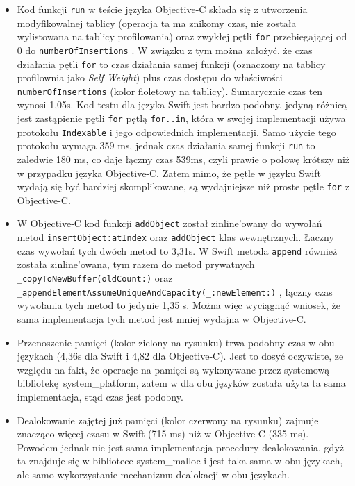 \documentclass[mgr, shortabstract]{iithesis}
\newcommand{\swiftinline}[1]{
    \texttt{#1}
}
\newcommand{\objcinline}[1]{
    \texttt{#1}
}
\begin{document}
\begin{itemize}
    \item Kod funkcji \objcinline{run} w teście języka Objective-C składa się z utworzenia modyfikowalnej tablicy (operacja ta ma znikomy czas, nie została wylistowana na tablicy profilowania) oraz zwykłej pętli \texttt{for} przebiegającej od 0 do \objcinline{numberOfInsertions}. W związku z tym można założyć, że czas działania pętli \texttt{for} to czas działania samej funkcji (oznaczony na tablicy profilownia jako \textit{Self Weight}) plus czas dostępu do właściwości \objcinline{numberOfInsertions} (kolor fioletowy na tablicy). Sumarycznie czas ten wynosi 1,05s. Kod testu dla języka Swift jest bardzo podobny, jedyną różnicą jest zastąpienie pętli \texttt{for} pętlą \texttt{for..in}, która w swojej implementacji używa protokołu \swiftinline{Indexable} i jego odpowiednich implementacji. Samo użycie tego protokołu wymaga 359 ms, jednak czas działania samej funkcji \swiftinline{run} to zaledwie 180 ms, co daje łączny czas 539ms, czyli prawie o połowę krótszy niż w przypadku języka Objective-C. Zatem mimo, że pętle w języku Swift wydają się być bardziej skomplikowane, są wydajniejsze niż proste pętle \texttt{for} z Objective-C.
    \item W Objective-C kod funkcji \objcinline{addObject} został zinline'owany do wywołań metod \objcinline{insertObject:atIndex} oraz \objcinline{addObject} klas wewnętrznych. Łaczny czas wywołań tych dwóch metod to 3,31s. W Swift metoda \swiftinline{append} również została zinline'owana, tym razem do metod prywatnych \swiftinline{_copyToNewBuffer(oldCount:)} oraz \swiftinline{_appendElementAssumeUniqueAndCapacity(_:newElement:)}, łączny czas wywołania tych metod to jedynie 1,35 s. Można więc wyciągnąć wniosek, że sama implementacja tych metod jest mniej wydajna w Objective-C.
    \item Przenoszenie pamięci (kolor zielony na rysunku) trwa podobny czas w obu językach (4,36s dla Swift i 4,82 dla Objective-C). Jest to dosyć oczywiste, ze względu na fakt, że operacje na pamięci są wykonywane przez systemową bibliotekę \textsf{system\_platform}, zatem w dla obu języków została użyta ta sama implementacja, stąd czas jest podobny.
    \item Dealokowanie zajętej już pamięci (kolor czerwony na rysunku) zajmuje znacząco więcej czasu w Swift (715 ms) niż w Objective-C (335 ms). Powodem jednak nie jest sama implementacja procedury dealokowania, gdyż ta znajduje się w bibliotece \textsf{system\_malloc} i jest taka sama w obu językach, ale samo wykorzystanie mechanizmu dealokacji w obu językach.

\end{itemize}
\end{document}
